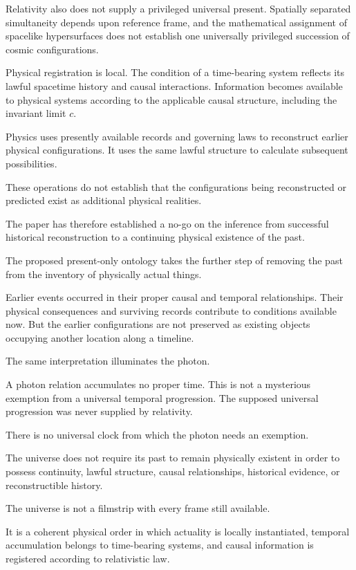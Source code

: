 \documentclass[12pt,onecolumn]{article}
\begin{document}
Relativity also does not supply a privileged universal present. Spatially separated simultaneity depends upon reference frame, and the mathematical assignment of spacelike hypersurfaces does not establish one universally privileged succession of cosmic configurations.

Physical registration is local. The condition of a time-bearing system reflects its lawful spacetime history and causal interactions. Information becomes available to physical systems according to the applicable causal structure, including the invariant limit \(c\).

Physics uses presently available records and governing laws to reconstruct earlier physical configurations. It uses the same lawful structure to calculate subsequent possibilities.

These operations do not establish that the configurations being reconstructed or predicted exist as additional physical realities.

The paper has therefore established a no-go on the inference from successful historical reconstruction to a continuing physical existence of the past.

The proposed present-only ontology takes the further step of removing the past from the inventory of physically actual things.

Earlier events occurred in their proper causal and temporal relationships. Their physical consequences and surviving records contribute to conditions available now. But the earlier configurations are not preserved as existing objects occupying another location along a timeline.

The same interpretation illuminates the photon.

A photon relation accumulates no proper time. This is not a mysterious exemption from a universal temporal progression. The supposed universal progression was never supplied by relativity.

There is no universal clock from which the photon needs an exemption.

The universe does not require its past to remain physically existent in order to possess continuity, lawful structure, causal relationships, historical evidence, or reconstructible history.

The universe is not a filmstrip with every frame still available.

It is a coherent physical order in which actuality is locally instantiated, temporal accumulation belongs to time-bearing systems, and causal information is registered according to relativistic law.
\end{document}
